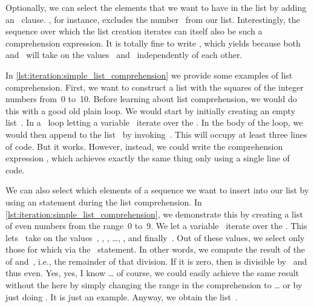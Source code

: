 Optionally, we can select the elements that we want to have in the list by adding an ~clause.
\pythonil{[i for i in range(10) if i != 3]}, for instance, excludes the number~ from our list.
Interestingly, the sequence over which the list creation iterates can itself also be such a comprehension expression.
It is totally fine to write , which yields \pythonil{[0, 0, 0, 1]} because both~ and~ will take on the values~ and~ independently of each other.

In \cref{lst:iteration:simple_list_comprehension} we provide some examples of list comprehension.
First, we want to construct a list with the squares of the integer numbers from~0 to~10.
Before learning about list comprehension, we would do this with a good old plain  loop.
We would start by initially creating an empty list~.
In a ~loop letting a variable~ iterate over the .
In the body of the loop, we would then append  to the list~ by invoking~.
This will occupy at least three lines of code.
But it works.
However, instead, we could write the comprehension expression , which achieves exactly the same thing only using a single line of code.

We can also select which elements of a sequence we want to insert into our list by using an  statement during the list comprehension.
In \cref{lst:iteration:simple_list_comprehension}, we demonstrate this by creating a list of even numbers from the range~0 to~9.
We let a variable~ iterate over the .
This lets~ take on the values~, , , \dots, , and finally~.
Out of these values, we select only those for which  via the ~statement.
In other words, we compute the result of the  of  and~, i.e., the remainder of that division.
If it is zero, then  is divisible by~ and thus even.
Yes, yes, I know {\dots} of course, we could easily achieve the same result without the  here by simply changing the range in the comprehension to  {\dots} or by just doing .
It is just an example.
Anyway, we obtain the list~\pythonil{[0, 2, 4, 6, 8]}.

